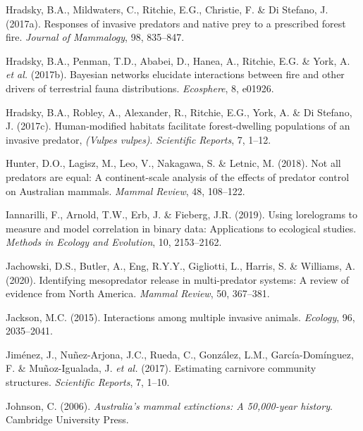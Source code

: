 \documentclass[11pt,a4paper,titlepage,twoside,openright]{style/unimelbthesis}
\begin{document}
\begin{mainmatter}
\leavevmode\hypertarget{ref-hradsky2017responses}{}%
Hradsky, B.A., Mildwaters, C., Ritchie, E.G., Christie, F. \& Di Stefano, J. (2017a). Responses of invasive predators and native prey to a prescribed forest fire. \emph{Journal of Mammalogy}, 98, 835--847.

\leavevmode\hypertarget{ref-hradsky2017bayesian}{}%
Hradsky, B.A., Penman, T.D., Ababei, D., Hanea, A., Ritchie, E.G. \& York, A. \emph{et al.} (2017b). Bayesian networks elucidate interactions between fire and other drivers of terrestrial fauna distributions. \emph{Ecosphere}, 8, e01926.

\leavevmode\hypertarget{ref-hradsky2017human}{}%
Hradsky, B.A., Robley, A., Alexander, R., Ritchie, E.G., York, A. \& Di Stefano, J. (2017c). Human-modified habitats facilitate forest-dwelling populations of an invasive predator, \emph{(Vulpes vulpes)}. \emph{Scientific Reports}, 7, 1--12.

\leavevmode\hypertarget{ref-hunter2018not}{}%
Hunter, D.O., Lagisz, M., Leo, V., Nakagawa, S. \& Letnic, M. (2018). Not all predators are equal: A continent-scale analysis of the effects of predator control on Australian mammals. \emph{Mammal Review}, 48, 108--122.

\leavevmode\hypertarget{ref-iannarilli2019lorelograms}{}%
Iannarilli, F., Arnold, T.W., Erb, J. \& Fieberg, J.R. (2019). Using lorelograms to measure and model correlation in binary data: Applications to ecological studies. \emph{Methods in Ecology and Evolution}, 10, 2153--2162.

\leavevmode\hypertarget{ref-jachowski2020identifying}{}%
Jachowski, D.S., Butler, A., Eng, R.Y.Y., Gigliotti, L., Harris, S. \& Williams, A. (2020). Identifying mesopredator release in multi-predator systems: A review of evidence from North America. \emph{Mammal Review}, 50, 367--381.

\leavevmode\hypertarget{ref-jackson2015interactions}{}%
Jackson, M.C. (2015). Interactions among multiple invasive animals. \emph{Ecology}, 96, 2035--2041.

\leavevmode\hypertarget{ref-jimenez2017estimating}{}%
Jiménez, J., Nuñez-Arjona, J.C., Rueda, C., González, L.M., García-Domínguez, F. \& Muñoz-Igualada, J. \emph{et al.} (2017). Estimating carnivore community structures. \emph{Scientific Reports}, 7, 1--10.

\leavevmode\hypertarget{ref-johnson2006australia}{}%
Johnson, C. (2006). \emph{Australia's mammal extinctions: A 50,000-year history}. Cambridge University Press.


\end{mainmatter}
\end{document}
